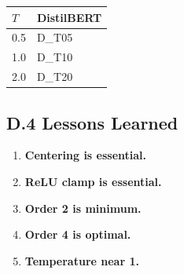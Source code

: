 \begin{table}[H]
\centering
\small
\begin{tabular}{ll}
\toprule
\textbf{$T$} & \textbf{DistilBERT} \\
\midrule
0.5 & {{D\_T05}} \\
1.0 & {{D\_T10}} \\
2.0 & {{D\_T20}} \\
\bottomrule
\end{tabular}
\end{table}

\subsection{D.4 Lessons Learned}

\begin{enumerate}
\item \textbf{Centering is essential.}
\item \textbf{ReLU clamp is essential.}
\item \textbf{Order 2 is minimum.}
\item \textbf{Order 4 is optimal.}
\item \textbf{Temperature near 1.}

\end{enumerate}
